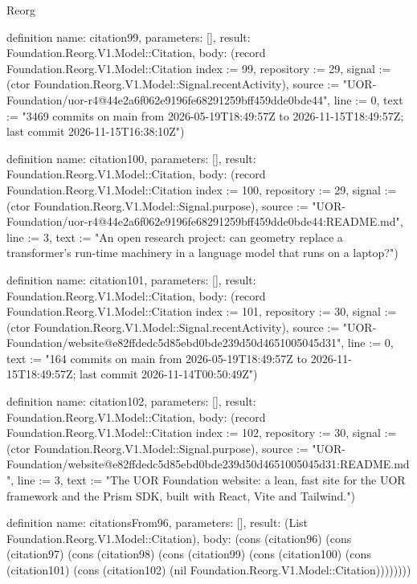 \begin{lexlean}{Reorg}
\begin{semanticmodule}
definition{
  name: citation99,
  parameters: [],
  result: Foundation.Reorg.V1.Model::Citation,
  body: (record Foundation.Reorg.V1.Model::Citation {index := 99, repository := 29, signal := (ctor Foundation.Reorg.V1.Model::Signal.recentActivity), source := "UOR-Foundation/uor-r4@44e2a6f062e9196fe68291259bff459dde0bde44", line := 0, text := "3469 commits on main from 2026-05-19T18:49:57Z to 2026-11-15T18:49:57Z; last commit 2026-11-15T16:38:10Z"})
}

definition{
  name: citation100,
  parameters: [],
  result: Foundation.Reorg.V1.Model::Citation,
  body: (record Foundation.Reorg.V1.Model::Citation {index := 100, repository := 29, signal := (ctor Foundation.Reorg.V1.Model::Signal.purpose), source := "UOR-Foundation/uor-r4@44e2a6f062e9196fe68291259bff459dde0bde44:README.md", line := 3, text := "An open research project: can geometry replace a transformer's run-time machinery in a language model that runs on a laptop?"})
}

definition{
  name: citation101,
  parameters: [],
  result: Foundation.Reorg.V1.Model::Citation,
  body: (record Foundation.Reorg.V1.Model::Citation {index := 101, repository := 30, signal := (ctor Foundation.Reorg.V1.Model::Signal.recentActivity), source := "UOR-Foundation/website@e82ffdedc5d85ebd0bde239d50d4651005045d31", line := 0, text := "164 commits on main from 2026-05-19T18:49:57Z to 2026-11-15T18:49:57Z; last commit 2026-11-14T00:50:49Z"})
}

definition{
  name: citation102,
  parameters: [],
  result: Foundation.Reorg.V1.Model::Citation,
  body: (record Foundation.Reorg.V1.Model::Citation {index := 102, repository := 30, signal := (ctor Foundation.Reorg.V1.Model::Signal.purpose), source := "UOR-Foundation/website@e82ffdedc5d85ebd0bde239d50d4651005045d31:README.md", line := 3, text := "The UOR Foundation website: a lean, fast site for the UOR framework and the Prism SDK, built with React, Vite and Tailwind."})
}

definition{
  name: citationsFrom96,
  parameters: [],
  result: (List Foundation.Reorg.V1.Model::Citation),
  body: (cons (citation96) (cons (citation97) (cons (citation98) (cons (citation99) (cons (citation100) (cons (citation101) (cons (citation102) (nil Foundation.Reorg.V1.Model::Citation))))))))
}


\end{semanticmodule}
\end{lexlean}
